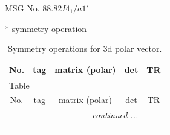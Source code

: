 \documentclass[fleqn,8pt]{jsarticle}
\begin{document}
\setcounter{MaxMatrixCols}{32}

\renewcommand{\tablename}{Table~}
\renewcommand{\figurename}{Figure~}
\begin{center}
\LARGE
MSG No. 88.82\quad$I4_{1}/a1'$
\end{center}
* symmetry operation
\renewcommand{\arraystretch}{1.3}
\begin{longtable}{ccccc}
\caption{Symmetry operations for 3d polar vector.}
 \\
 \hline \hline
No. & tag & matrix (polar) & det & TR \\ \hline \endfirsthead

\multicolumn{4}{l}{\tablename\ \thetable{}} \\
 \hline \hline
No. & tag & matrix (polar) & det & TR \\ \hline \endhead

 \hline \hline
\multicolumn{4}{r}{\footnotesize\it continued ...} \\ \endfoot

 \hline \hline
\multicolumn{4}{r}{} \\ \endlastfoot


\end{longtable}
\end{document}

